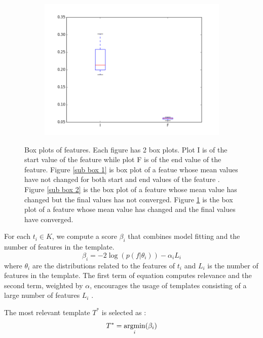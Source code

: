 \begin{figure}
\begin{subfigure}[b]{0.3\textwidth}
        \includegraphics[scale=0.25]{images/boxplot_converged.png} 
        \caption{}
        \label{sub box 3}
    \end{subfigure}
    \caption[Box plot of features]{Box plots of features. Each figure has 2 box plots.
Plot I is of the start value of the feature while plot F is of the end value
of the feature. Figure \ref{sub box 1} is box plot of a featue whose mean values 
have not changed for both start and end values of the feature .
Figure \ref{sub box 2} is the box plot of a feature whose mean value 
has changed but the final values has not converged. 
Figure \ref{sub box 3} is the box plot of a feature whose mean value 
has changed and the final values have converged.} \label{fig:box plot}
\end{figure}


For each $t_i \in K $, we compute a score $\beta_i$ that combines model fitting and the number of 
features in the template.
\begin{equation}
    \beta_i = -2 \log (p (f | \theta_i)) - \alpha_i L_i
\end{equation}
where $\theta_i$ are the distributions related to the features of $t_i$
and $L_i$ is the number of features in the template.
The first term of equation  computes relevance and the second term, weighted by $\alpha$, encourages the usage of templates
consisting of a large number of features $L_i$ .


The most relevant template $T^*$ is selected as :
\begin{equation}
    T^* = \operatornamewithlimits{argmin}_i (\beta_i)
\end{equation}
